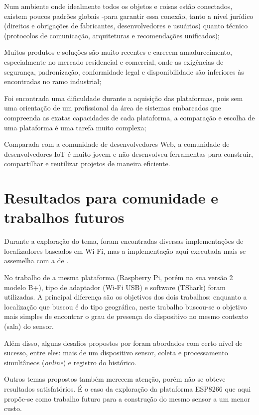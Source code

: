 \begin{alineas}
	\item Num ambiente onde
	idealmente todos os objetos e coisas estão conectados, existem poucos padrões globais
	-para garantir essa conexão, tanto a nível jurídico (direitos e
	obrigações de fabricantes, desenvolvedores e usuários) quanto técnico
	(protocolos de comunicação, arquiteturas e recomendações unificados);

	\item Muitos produtos e soluções são muito recentes e carecem amadurecimento,
	especialmente no mercado residencial e comercial, onde as exigências de
	segurança, padronização, conformidade legal e disponibilidade são inferiores
	às encontradas no ramo industrial;

	\item Foi encontrada uma dificuldade durante a aquisição das plataformas, pois
	sem uma orientação de um profissional da área de sistemas embarcados que compreenda as exatas capacidades de cada plataforma, a
	comparação e escolha de uma plataforma é uma tarefa muito complexa;

	\item Comparada com a comunidade de desenvolvedores Web, a comunidade
	de desenvolvedores IoT é muito jovem e não desenvolveu ferramentas para
	construir, compartilhar e reutilizar projetos de maneira eficiente.
\end{alineas}


\section{Resultados para comunidade e trabalhos futuros}
\label{sec:trab-futuros}

Durante a exploração do tema, foram encontradas diversas implementações de
localizadores baseados em Wi-Fi, mas a implementação aqui executada mais se
assemelha com a de .

No trabalho de  a mesma plataforma (Raspberry Pi, porém
na sua versão 2 modelo B+), tipo de adaptador (Wi-Fi USB) e software (TShark)
foram utilizadas. A principal diferença são os objetivos dos dois trabalhos:
enquanto a localização que  buscou é do tipo
geográfica, neste trabalho buscou-se o objetivo mais simples de encontrar o grau
de presença do dispositivo no mesmo contexto (sala) do sensor.

Além disso, alguns desafios propostos por  foram
abordados com certo nível de sucesso, entre eles: mais de um dispositivo sensor,
coleta e processamento simultâneos (\emph{online}) e registro do histórico.

Outros temas propostos também merecem atenção, porém não se obteve resultados
satisfatórios. É o caso da exploração da plataforma ESP8266 que aqui propõe-se
como trabalho futuro para a construção do mesmo sensor a um menor custo.
